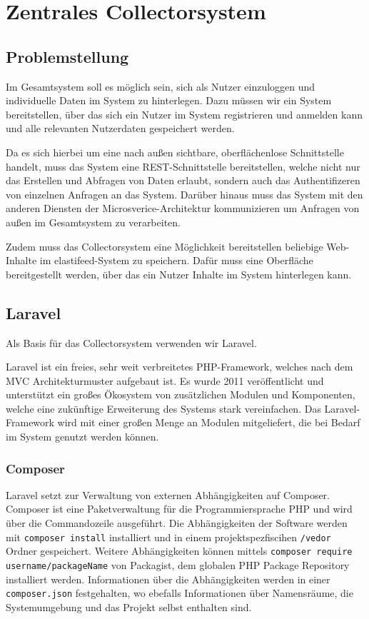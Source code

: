 \chapter{Zentrales Collectorsystem}



\section{Problemstellung}
    Im Gesamtsystem soll es möglich sein, sich als Nutzer einzuloggen und individuelle Daten im System zu hinterlegen.
    Dazu müssen wir ein System bereitstellen, über das sich ein Nutzer im System registrieren und anmelden kann und alle relevanten Nutzerdaten gespeichert werden.
    
    Da es sich hierbei um eine nach außen sichtbare, oberflächenlose Schnittstelle handelt, muss das System eine REST-Schnittstelle bereitstellen, welche nicht nur das Erstellen und Abfragen von Daten erlaubt, sondern auch das Authentifizeren von einzelnen Anfragen an das System. Darüber hinaus muss das System mit den anderen Diensten der Microsverice-Architektur kommunizieren um Anfragen von außen im Gesamtsystem zu verarbeiten.
    
    Zudem muss das Collectorsystem eine Möglichkeit bereitstellen beliebige Web-Inhalte im elastifeed-System zu speichern. Dafür muss eine Oberfläche bereitgestellt werden, über das ein Nutzer Inhalte im System hinterlegen kann.

\section{Laravel}
    Als Basis für das Collectorsystem verwenden wir Laravel.
    
    Laravel ist ein freies, sehr weit verbreitetes PHP-Framework, welches nach dem MVC Architekturmuster aufgebaut ist. Es wurde 2011 veröffentlicht und unterstützt ein großes Ökosystem von zusätzlichen Modulen und Komponenten, welche eine zukünftige Erweiterung des Systems stark vereinfachen. Das Laravel-Framework wird mit einer großen Menge an Modulen mitgeliefert, die bei Bedarf im System genutzt werden können.
    
    
    \subsection{Composer}
        Laravel setzt zur Verwaltung von externen Abhängigkeiten auf Composer. Composer ist eine Paketverwaltung für die Programmiersprache PHP und wird über die Commandozeile ausgeführt. Die Abhängigkeiten der Software werden mit \texttt{composer install} installiert und in einem projektspezfiscihen \texttt{/vedor} Ordner gespeichert. Weitere Abhängigkeiten können mittels \texttt{composer require username/packageName} von Packagist, dem globalen PHP Package Repository installiert werden. Informationen über die Abhängigkeiten werden in einer \texttt{composer.json} festgehalten, wo ebefalls Informationen über Namensräume, die Systemumgebung und das Projekt selbst enthalten sind. 
        
